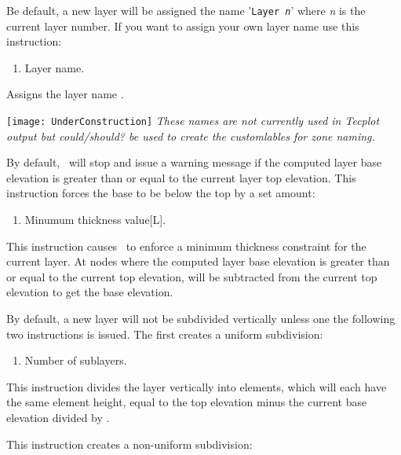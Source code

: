 Be default, a new layer will be assigned the name '\texttt{Layer {\em n}}' where {\em n} is the current layer number.  If you want to assign your own layer name use this instruction:

    { \squish
    \begin{enumerate}
    \item {} Layer name.
    \end{enumerate}
    Assigns the layer name .
    }

\texttt{[image: UnderConstruction]} \textit{These names are not currently used in Tecplot output but could/should? be used to create the customlables for zone naming.}



By default, \mut\ will stop and issue a warning message if the computed layer base elevation is greater than or equal to the current layer top elevation.  This instruction forces the base to be below the top by a set amount:

    {\squish
    \begin{enumerate}
    \item {} Minumum thickness value[L].
    \end{enumerate}
    This instruction causes \mut\ to enforce a minimum thickness constraint for the current layer. At nodes where the computed layer base elevation is greater than or equal to the current top elevation,  will
    be subtracted from the current top elevation to get the base elevation.
    }

By default, a new layer will not be subdivided vertically unless one the following two instructions is issued.
The first creates a uniform subdivision:

    {\squish
    \begin{enumerate}
    \item {} Number of sublayers.
    \end{enumerate}
    This instruction divides the layer vertically into 
    elements, which will each have the same element height, equal to the top elevation
    minus the current base elevation divided by .
    }

This instruction creates a non-uniform subdivision:

